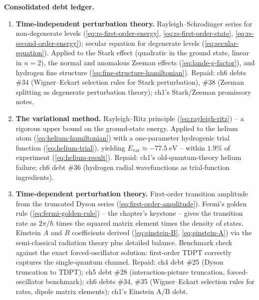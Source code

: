 \medskip\noindent\textbf{Consolidated debt ledger.}
\begin{enumerate}
\item[\S 8.1--8.2] \textbf{Time-independent perturbation theory.} Rayleigh--Schrodinger series for non-degenerate levels (\eqref{eq:rs-first-order-energy}, \eqref{eq:rs-first-order-state}, \eqref{eq:rs-second-order-energy}); secular equation for degenerate levels (\eqref{eq:secular-equation}). Applied to the Stark effect (quadratic in the ground state, linear in $n=2$), the normal and anomalous Zeeman effects (\eqref{eq:lande-g-factor}), and hydrogen fine structure (\eqref{eq:fine-structure-hamiltonian}). Repaid: ch6 debts \#34 (Wigner--Eckart selection rules for Stark perturbation), \#38 (Zeeman splitting as degenerate perturbation theory); ch1's Stark/Zeeman promissory notes.

\item[\S 8.3] \textbf{The variational method.} Rayleigh--Ritz principle (\eqref{eq:rayleigh-ritz}) -- a rigorous upper bound on the ground-state energy. Applied to the helium atom (\eqref{eq:helium-hamiltonian}) with a one-parameter hydrogenic trial function (\eqref{eq:helium-trial}), yielding $E_{\text{var}} \approx -77.5\;\text{eV}$ -- within $1.9\%$ of experiment (\eqref{eq:helium-result}). Repaid: ch1's old-quantum-theory helium failure; ch6 debt \#36 (hydrogen radial wavefunctions as trial-function ingredients).

\item[\S 8.4] \textbf{Time-dependent perturbation theory.} First-order transition amplitude from the truncated Dyson series (\eqref{eq:first-order-amplitude}). Fermi's golden rule (\eqref{eq:fermi-golden-rule}) -- the chapter's keystone -- gives the transition rate as $2\pi/\hbar$ times the squared matrix element times the density of states. Einstein $A$ and $B$ coefficients derived (\eqref{eq:einstein-B}, \eqref{eq:einstein-A}) via the semi-classical radiation theory plus detailed balance. Benchmark check against the exact forced-oscillator solution: first-order TDPT correctly captures the single-quantum channel. Repaid: ch4 debt \#25 (Dyson truncation to TDPT); ch5 debt \#28 (interaction-picture truncation, forced-oscillator benchmark); ch6 debts \#34, \#35 (Wigner--Eckart selection rules for rates, dipole matrix elements); ch1's Einstein A/B debt.


\end{enumerate}
